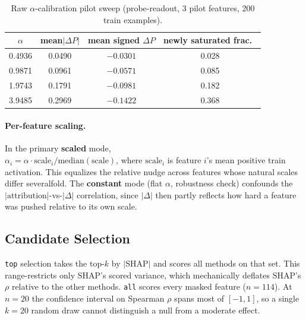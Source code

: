 \begin{table}[h]
\centering
\caption{Raw $\alpha$-calibration pilot sweep (probe-readout, 3 pilot features, 200 train examples).}
\label{tab:app-alpha-pilot-raw}
\begin{tabular}{cccc}
\toprule
$\alpha$ & mean$|\Delta P|$ & mean signed $\Delta P$ & newly saturated frac.\ \\
\midrule
0.4936 & 0.0490 & $-0.0301$ & 0.028 \\
0.9871 & 0.0961 & $-0.0571$ & 0.085 \\
1.9743 & 0.1791 & $-0.0981$ & 0.182 \\
3.9485 & 0.2969 & $-0.1422$ & 0.368 \\
\bottomrule
\end{tabular}
\end{table}

\paragraph{Per-feature scaling.} In the primary \textbf{scaled} mode,\\
$\alpha_i = \alpha \cdot \mathrm{scale}_i / \mathrm{median}(\mathrm{scale})$,
where $\mathrm{scale}_i$ is feature $i$'s mean positive train activation.
This equalizes the relative nudge across features whose natural scales
differ severalfold. The \textbf{constant} mode (flat $\alpha$, robustness
check) confounds the $|\text{attribution}|$-vs-$|\Delta|$ correlation,
since $|\Delta|$ then partly reflects how hard a feature was pushed
relative to its own scale.

\subsection{Candidate Selection}
\label{app:selection}

\texttt{top} selection takes the top-$k$ by $|\mathrm{SHAP}|$ and scores all
methods on that set. This range-restricts only SHAP's scored variance,
which mechanically deflates SHAP's $\rho$ relative to the other methods.
\texttt{all} scores every masked feature ($n=114$). At $n=20$ the
confidence interval on Spearman $\rho$ spans most of $[-1,1]$, so a single
$k=20$ random draw cannot distinguish a null from a moderate effect.


